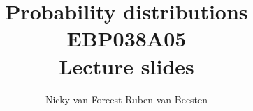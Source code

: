 \usepackage{../sources/preamble}


\setcounter{tocdepth}{1}
\usepackage{a4wide}
\usepackage{../sources/abbreviations}


\title{Probability distributions EBP038A05\\
Lecture slides}

\author{Nicky van Foreest Ruben van Beesten}
